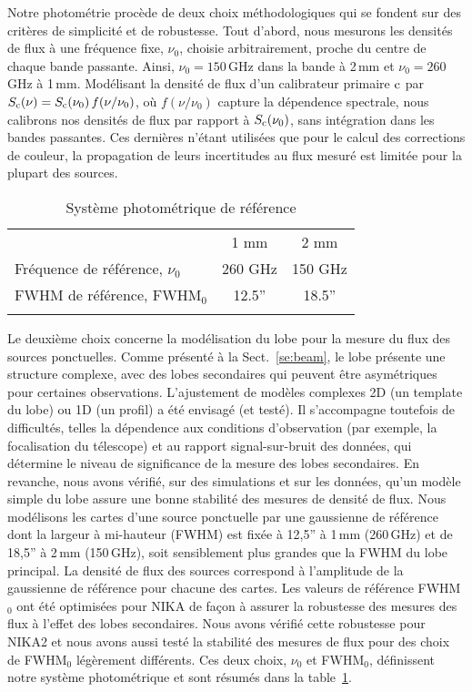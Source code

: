 Notre photométrie procède de deux choix méthodologiques qui se fondent
sur des critères de simplicité et de robustesse. Tout d'abord, nous
mesurons les densités de flux à une fréquence fixe, $\nu_0$, choisie
arbitrairement, proche du centre de chaque bande passante. Ainsi,
$\nu_0 = 150$\,GHz dans la bande à 2\,mm et $\nu_0 = 260$\,GHz à
1\,mm. Modélisant la densité de flux d'un calibrateur primaire
$\rm{c}$ par $S_{\rm{c}} (\nu) = S_{\rm{c}} (\nu_0)\, f(\nu/\nu_0)$,
où $f(\nu/\nu_0)$ capture la dépendence spectrale, nous calibrons nos
densités de flux par rapport à $S_{\rm{c}} (\nu_0)$, sans intégration
dans les bandes passantes. Ces dernières n'étant utilisées que pour le
calcul des corrections de couleur, la propagation de leurs
incertitudes au flux mesuré est limitée pour la plupart des sources.
%
\begin{table}[!htbp]
\caption{Système photométrique de référence}
\label{tab:definitions}
\centering     
\begin{tabular}{lcc}
\hline\hline
      \noalign{\smallskip}
      & 1 mm & 2 mm \\
      \noalign{\smallskip}
      \hline
      \noalign{\smallskip}
      Fréquence de référence, $\nu_{0}$ & 260 GHz & 150 GHz \\
      FWHM de référence,  FWHM$_{0}$    & 12.5'' & 18.5'' \\
      \noalign{\smallskip}
      \hline
\end{tabular}
\end{table}
%

Le deuxième choix concerne la modélisation du lobe pour la mesure du
flux des sources ponctuelles. Comme présenté à la
Sect.~\ref{se:beam}, le lobe présente une structure complexe, avec
des lobes secondaires qui peuvent être asymétriques pour certaines
observations. L'ajustement de modèles complexes 2D (un template du
lobe) ou 1D (un profil) a été envisagé (et testé). Il s'accompagne
toutefois de difficultés, telles la dépendence aux conditions
d'observation (par exemple, la focalisation du télescope) et au
rapport signal-sur-bruit des données, qui détermine le niveau de
significance de la mesure des lobes secondaires. En revanche, nous
avons vérifié, sur des simulations et sur les données, qu'un modèle
simple du lobe assure une bonne stabilité des mesures de densité de
flux. Nous modélisons les cartes d'une source ponctuelle par une gaussienne
de référence dont la largeur à mi-hauteur (FWHM) est fixée à 
12,5'' à 1\,mm (260\,GHz) et de 18,5'' à 2\,mm (150\,GHz), soit
sensiblement plus grandes que la FWHM du lobe principal. La densité de
flux des sources correspond à l'amplitude de la gaussienne de
référence pour chacune des cartes. Les valeurs de référence FWHM$_0$ ont
été optimisées pour NIKA de façon à assurer la robustesse des mesures
des flux à l'effet des lobes secondaires. Nous avons vérifié cette
robustesse pour NIKA2 et nous avons aussi testé la stabilité des
mesures de flux pour des choix de FWHM$_0$ légèrement différents. Ces
deux choix, $\nu_0$ et FWHM$_0$, définissent notre système
photométrique et sont résumés dans la table~\ref{tab:definitions}.

